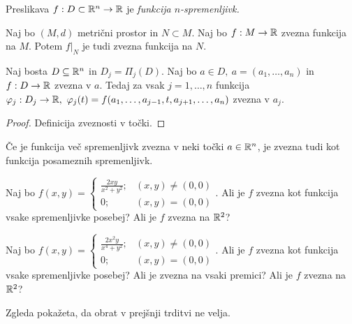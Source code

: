 \begin{definicija}
    Preslikava $f: D \subset \mathbb{R}^n \to \mathbb{R}$ je \emph{funkcija $n$-spremenljivk.}
\end{definicija}

\begin{opomba}
    Naj bo $(M, d)$ metrični prostor in $N \subset M$. Naj bo $f: M \to \mathbb{R}$ zvezna funkcija na $M$. Potem $f|_N$ je tudi zvezna funkcija na $N$.
\end{opomba}

\begin{trditev}
    Naj bosta $D \subseteq \mathbb{R}^n$ in $D_j = \Pi_j(D)$. Naj bo $a \in D, \ a =(a_1, \ldots, a_n)$ in $f: D \to \mathbb{R}$ zvezna v $a$. Tedaj za vsak $j = 1, \ldots, n$ funkcija $\varphi_j: D_j \to \RR, \ \varphi_j(t) = f(a_1, \ldots, a_{j-1}, t, a_{j+1}, \ldots, a_n)$ zvezna v $a_j$.
\end{trditev}

\begin{proof}
    Definicija zveznosti v točki.
\end{proof}

\begin{opomba}
    Če je funkcija več spremenljivk zvezna v neki točki $a \in \mathbb{R}^n$, je zvezna tudi kot funkcija posameznih spremenljivk.
\end{opomba}

\begin{zgled}
    Naj bo $f(x,y) = \begin{cases}
        \frac{2xy}{x^2+y^2}; &(x,y) \neq (0,0) \\
        0; &(x,y) = (0,0)
    \end{cases}$. Ali je $f$ zvezna kot funkcija vsake spremenljivke posebej? Ali je $f$ zvezna na $\mathbb{R}^2$?
\end{zgled}

\begin{zgled}
    Naj bo $f(x,y) = \begin{cases}
        \frac{2x^2y}{x^4+y^2}; &(x,y) \neq (0,0) \\
        0; &(x,y) = (0,0)
    \end{cases}$. Ali je $f$ zvezna kot funkcija vsake spremenljivke posebej? Ali je zvezna na vsaki premici? Ali je $f$ zvezna na $\mathbb{R}^2$?
\end{zgled}

\begin{opomba}
    Zgleda pokažeta, da obrat v prejšnji trditvi ne velja.
\end{opomba}

